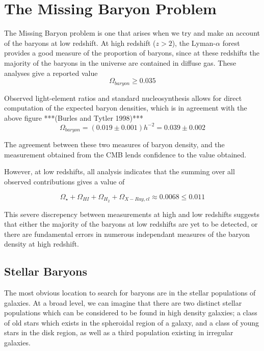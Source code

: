 \chapter{The Missing Baryon Problem}

The Missing Baryon problem is one that arises when we try and make an account of the baryons at low redshift. At high redshift ($z>2$), the Lyman-$\alpha$ forest provides a good measure of the proportion of baryons, since at these redshifts the majority of the baryons in the universe are contained in diffuse gas. These analyses give a reported value 
$$\Omega_{baryon} \geq 0.035 $$ 

Observed light-element ratios and standard nucleosynthesis allows for direct computation of the expected baryon densities, which is in agreement with the above figure ***(Burles and Tytler 1998)***
$$\Omega_{baryon} = (0.019\pm 0.001)h^{-2} = 0.039 \pm 0.002 $$

The agreement between these two measures of baryon density, and the measurement obtained from the CMB lends confidence to the value obtained. 

\par However, at low redshifts, all analysis indicates that the summing over all observed contributions gives a value of 

$$\Omega_\star + \Omega_{HI} + \Omega_{H_2} + \Omega_{X-Ray,cl} \approx 0.0068 \leq 0.011 $$

This severe discrepency between measurements at high and low redshifts suggests that either the majority of the baryons at low redshifts are yet to be detected, or there are fundamental errors in numerous independant measures of the baryon density at high redshift. 

\section{Stellar Baryons}
The most obvious location to search for baryons are in the stellar populations of galaxies. At a broad level, we can imagine that there are two distinct stellar populations which can be considered to be found in high density galaxies; a class of old stars which exists in the spheroidal region of a galaxy, and a class of young stars in the disk region, as well as a third population existing in irregular galaxies.

